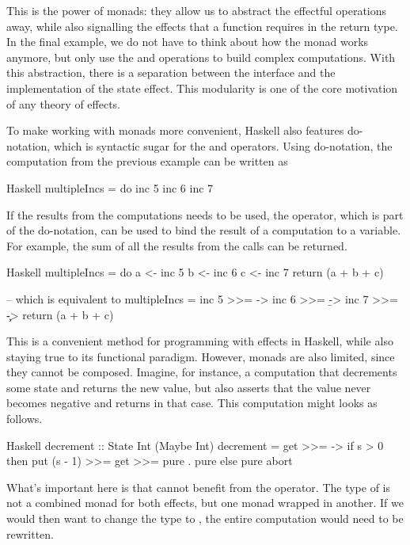 \noindent This is the power of monads: they allow us to abstract the effectful operations away, while also signalling the effects that a function requires in the return type. In the final example, we do not have to think about how the  monad works anymore, but only use the  and  operations to build complex computations. With this abstraction, there is a separation between the interface and the implementation of the state effect. This modularity is one of the core motivation of any theory of effects. 

To make working with monads more convenient, Haskell also features do-notation, which is syntactic sugar for the \hs{>>=} and \hs{>>} operators. Using do-notation, the  computation from the previous example can be written as

\begin{lst}{Haskell}
multipleIncs = do
  inc 5
  inc 6
  inc 7
\end{lst}

If the results from the  computations needs to be used, the \hs{<-} operator, which is part of the do-notation, can be used to bind the result of a computation to a variable. For example, the sum of all the results from the  calls can be returned.

\begin{lst}{Haskell}
multipleIncs = do
  a <- inc 5
  b <- inc 6
  c <- inc 7
  return (a + b + c)

-- which is equivalent to
multipleIncs = 
  inc 5 >>= \a ->
    inc 6 >>= \b ->
      inc 7 >>= \c ->
        return (a + b + c)
\end{lst}

\noindent This is a convenient method for programming with effects in Haskell, while also staying true to its functional paradigm. However, monads are also limited, since they cannot be composed. Imagine, for instance, a computation that decrements some state and returns the new value, but also asserts that the value never becomes negative and returns  in that case. This computation might looks as follows.

\begin{lst}{Haskell}
decrement :: State Int (Maybe Int)
decrement = get >>= \s ->
              if s > 0
              then put (s - 1) >>= get >>= pure . pure
              else pure abort
\end{lst}

\noindent What's important here is that  cannot benefit from the \hs{>>=} operator. The type of  is not a combined monad for both effects, but one monad wrapped in another. If we would then want to change the type to , the entire computation would need to be rewritten.

